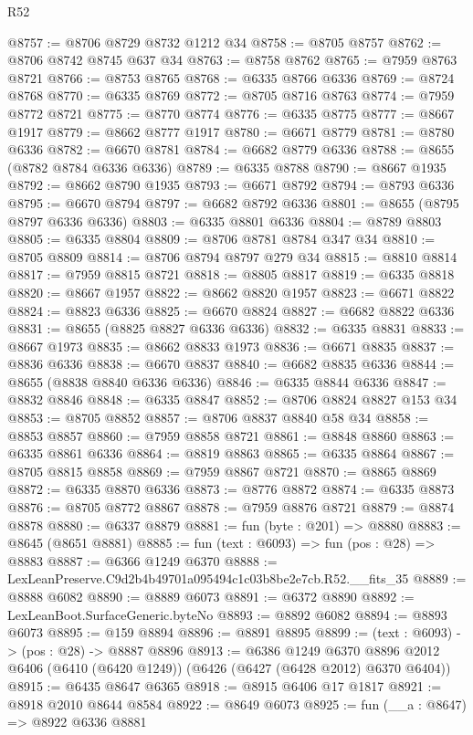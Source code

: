 \begin{lexlean}{R52}
\begin{coremodule}
@8757 := @8706 @8729 @8732 @1212 @34
@8758 := @8705 @8757
@8762 := @8706 @8742 @8745 @637 @34
@8763 := @8758 @8762
@8765 := @7959 @8763 @8721
@8766 := @8753 @8765
@8768 := @6335 @8766 @6336
@8769 := @8724 @8768
@8770 := @6335 @8769
@8772 := @8705 @8716 @8763
@8774 := @7959 @8772 @8721
@8775 := @8770 @8774
@8776 := @6335 @8775
@8777 := @8667 @1917
@8779 := @8662 @8777 @1917
@8780 := @6671 @8779
@8781 := @8780 @6336
@8782 := @6670 @8781
@8784 := @6682 @8779 @6336
@8788 := @8655 (@8782 @8784 @6336 @6336)
@8789 := @6335 @8788
@8790 := @8667 @1935
@8792 := @8662 @8790 @1935
@8793 := @6671 @8792
@8794 := @8793 @6336
@8795 := @6670 @8794
@8797 := @6682 @8792 @6336
@8801 := @8655 (@8795 @8797 @6336 @6336)
@8803 := @6335 @8801 @6336
@8804 := @8789 @8803
@8805 := @6335 @8804
@8809 := @8706 @8781 @8784 @347 @34
@8810 := @8705 @8809
@8814 := @8706 @8794 @8797 @279 @34
@8815 := @8810 @8814
@8817 := @7959 @8815 @8721
@8818 := @8805 @8817
@8819 := @6335 @8818
@8820 := @8667 @1957
@8822 := @8662 @8820 @1957
@8823 := @6671 @8822
@8824 := @8823 @6336
@8825 := @6670 @8824
@8827 := @6682 @8822 @6336
@8831 := @8655 (@8825 @8827 @6336 @6336)
@8832 := @6335 @8831
@8833 := @8667 @1973
@8835 := @8662 @8833 @1973
@8836 := @6671 @8835
@8837 := @8836 @6336
@8838 := @6670 @8837
@8840 := @6682 @8835 @6336
@8844 := @8655 (@8838 @8840 @6336 @6336)
@8846 := @6335 @8844 @6336
@8847 := @8832 @8846
@8848 := @6335 @8847
@8852 := @8706 @8824 @8827 @153 @34
@8853 := @8705 @8852
@8857 := @8706 @8837 @8840 @58 @34
@8858 := @8853 @8857
@8860 := @7959 @8858 @8721
@8861 := @8848 @8860
@8863 := @6335 @8861 @6336
@8864 := @8819 @8863
@8865 := @6335 @8864
@8867 := @8705 @8815 @8858
@8869 := @7959 @8867 @8721
@8870 := @8865 @8869
@8872 := @6335 @8870 @6336
@8873 := @8776 @8872
@8874 := @6335 @8873
@8876 := @8705 @8772 @8867
@8878 := @7959 @8876 @8721
@8879 := @8874 @8878
@8880 := @6337 @8879
@8881 := fun (byte : @201) => @8880
@8883 := @8645 (@8651 @8881)
@8885 := fun (text : @6093) => fun (pos : @28) => @8883
@8887 := @6366 @1249 @6370
@8888 := LexLeanPreserve.C9d2b4b49701a095494c1c03b8be2e7cb.R52.__fits_35
@8889 := @8888 @6082
@8890 := @8889 @6073
@8891 := @6372 @8890
@8892 := LexLeanBoot.SurfaceGeneric.byteNo
@8893 := @8892 @6082
@8894 := @8893 @6073
@8895 := @159 @8894
@8896 := @8891 @8895
@8899 := (text : @6093) -> (pos : @28) -> @8887 @8896
@8913 := @6386
    @1249
    @6370
    @8896
    @2012
    @6406
    (@6410 (@6420 @1249))
    (@6426 (@6427 (@6428 @2012) @6370 @6404))
@8915 := @6435 @8647 @6365
@8918 := @8915 @6406 @17 @1817
@8921 := @8918 @2010 @8644 @8584
@8922 := @8649 @6073
@8925 := fun (__a : @8647) => @8922 @6336 @8881

\end{coremodule}
\end{lexlean}
